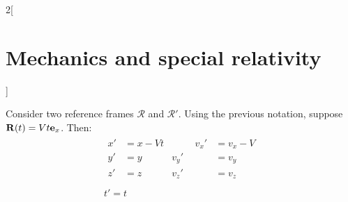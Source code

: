 \documentclass[../../../main.tex]{subfiles}
\begin{document}
\begin{multicols}{2}[\section{Mechanics and special relativity}]
\begin{prop}
    \end{prop}
    \begin{prop}
        Consider two reference frames $\mathcal{R}$ and $\mathcal{R}'$. Using the previous notation, suppose $\boldsymbol{\mathrm{R}}(t)=Vt\boldsymbol{\mathrm{e}}_x$. Then:
        \begin{gather*}
            \begin{aligned}
                x' & =x-Vt & \hspace{1cm} v_x' & =v_x-V \\
                y' & =y    & v_y'              & =v_y   \\
                z' & =z    & v_z'              & =v_z   \\
            \end{aligned}\\
            t'=t
        \end{gather*}
    \end{prop}

\end{multicols}
\end{document}
